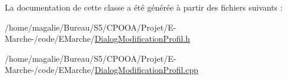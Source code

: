 La documentation de cette classe a été générée à partir des fichiers suivants \-:\begin{DoxyCompactItemize}
\item 
/home/magalie/\-Bureau/\-S5/\-C\-P\-O\-O\-A/\-Projet/\-E-\/\-Marche-\//code/\-E\-Marche/\hyperlink{_dialog_modification_profil_8h}{Dialog\-Modification\-Profil.\-h}\item 
/home/magalie/\-Bureau/\-S5/\-C\-P\-O\-O\-A/\-Projet/\-E-\/\-Marche-\//code/\-E\-Marche/\hyperlink{_dialog_modification_profil_8cpp}{Dialog\-Modification\-Profil.\-cpp}\end{DoxyCompactItemize}
